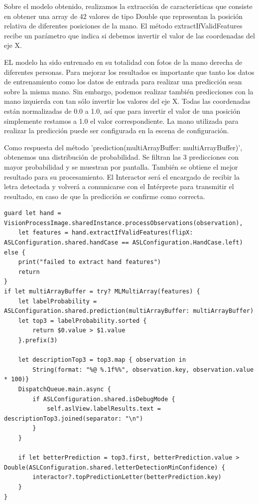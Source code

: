 \documentclass[../main.tex]{subfiles}
\begin{document}
Sobre el modelo obtenido, realizamos la extracción de características que consiste en obtener una array de 42 valores de tipo Double que representan la posición relativa de diferentes posiciones de la mano. El método extractIfValidFeatures recibe un parámetro que indica si debemos invertir el valor de las coordenadas del eje X. 

EL modelo ha sido entrenado en su totalidad con fotos de la mano derecha de diferentes personas. Para mejorar los resultados es importante que tanto los datos de entrenamiento como los datos de entrada para realizar una predicción sean sobre la misma mano. Sin embargo, podemos realizar también predicciones con la mano izquierda con tan sólo invertir los valores del eje X. Todas las coordenadas están normalizadas de 0.0 a 1.0, así que para invertir el valor de una posición simplemente restamos a 1.0 el valor correspondiente. La mano utilizada para realizar la predicción puede ser configurada en la escena de configuración.

Como respuesta del método 'prediction(multiArrayBuffer: multiArrayBuffer)', obtenemos una distribución de probabilidad. Se filtran las 3 predicciones con mayor probabilidad y se muestran por pantalla. También se obtiene el mejor resultado para su procesamiento. El Interactor será el encargado de recibir la letra detectada y volverá a comunicarse con el Intérprete para transmitir el resultado, en caso de que la predicción se confirme como correcta.

\begin{lstlisting}[style=swift]
guard let hand = VisionProcessImage.sharedInstance.processObservations(observation),
    let features = hand.extractIfValidFeatures(flipX: ASLConfiguration.shared.handCase == ASLConfiguration.HandCase.left) else {
    print("failed to extract hand features")
    return
}
if let multiArrayBuffer = try? MLMultiArray(features) {
    let labelProbability = ASLConfiguration.shared.prediction(multiArrayBuffer: multiArrayBuffer)
    let top3 = labelProbability.sorted {
        return $0.value > $1.value
    }.prefix(3)
    
    let descriptionTop3 = top3.map { observation in
        String(format: "%@ %.1f%%", observation.key, observation.value * 100)}
    DispatchQueue.main.async {
        if ASLConfiguration.shared.isDebugMode {
            self.aslView.labelResults.text = descriptionTop3.joined(separator: "\n")
        }
    }
    
    if let betterPrediction = top3.first, betterPrediction.value > Double(ASLConfiguration.shared.letterDetectionMinConfidence) {
        interactor?.topPredictionLetter(betterPrediction.key)
    }
}
\end{lstlisting}
\end{document}
